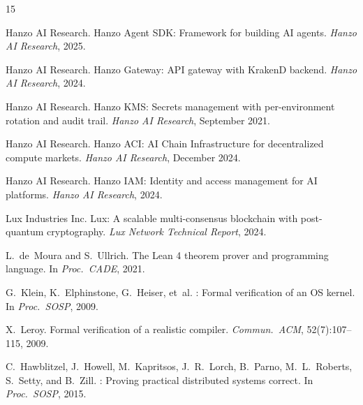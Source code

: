 \begin{thebibliography}{15}

{Hanzo AI Research}.
\newblock Hanzo Agent {SDK}: Framework for building {AI} agents.
\newblock \emph{Hanzo AI Research}, 2025.

{Hanzo AI Research}.
\newblock Hanzo Gateway: {API} gateway with {KrakenD} backend.
\newblock \emph{Hanzo AI Research}, 2024.

{Hanzo AI Research}.
\newblock Hanzo {KMS}: Secrets management with per-environment rotation and audit trail.
\newblock \emph{Hanzo AI Research}, September 2021.

{Hanzo AI Research}.
\newblock Hanzo {ACI}: {AI} Chain Infrastructure for decentralized compute markets.
\newblock \emph{Hanzo AI Research}, December 2024.

{Hanzo AI Research}.
\newblock Hanzo {IAM}: Identity and access management for {AI} platforms.
\newblock \emph{Hanzo AI Research}, 2024.

{Lux Industries Inc}.
\newblock Lux: A scalable multi-consensus blockchain with post-quantum cryptography.
\newblock \emph{Lux Network Technical Report}, 2024.

L.~de~Moura and S.~Ullrich.
\newblock The {Lean 4} theorem prover and programming language.
\newblock In \emph{Proc.\ CADE}, 2021.

G.~Klein, K.~Elphinstone, G.~Heiser, et~al.
: Formal verification of an {OS} kernel.
\newblock In \emph{Proc.\ SOSP}, 2009.

X.~Leroy.
\newblock Formal verification of a realistic compiler.
\newblock \emph{Commun.\ ACM}, 52(7):107--115, 2009.

C.~Hawblitzel, J.~Howell, M.~Kapritsos, J.~R.~Lorch, B.~Parno, M.~L.~Roberts,
S.~Setty, and B.~Zill.
: Proving practical distributed systems correct.
\newblock In \emph{Proc.\ SOSP}, 2015.

\end{thebibliography}

